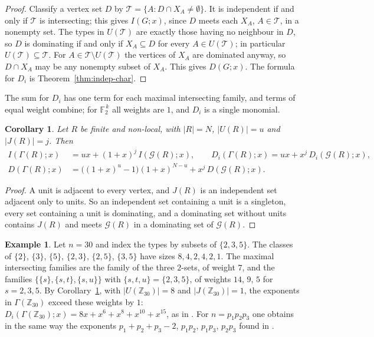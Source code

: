 \documentclass[11pt]{amsart}
\newtheorem{corollary}[theorem]{Corollary}
\theoremstyle{definition}
\newtheorem{example}[theorem]{Example}
\theoremstyle{remark}
\newcommand{\Jac}{J}
\newcommand{\G}{\mathcal{G}}
\newcommand{\Z}{\mathbb{Z}}
\newcommand{\FF}{\mathbb{F}}
\newcommand{\Bool}[1]{\FF_2^{\,#1}}
\begin{document}
\begin{proof}
Classify a vertex set $D$ by $\mathcal T=\{A:D\cap X_A\ne\emptyset\}$. It is independent if and only
if $\mathcal T$ is intersecting; this gives $I(G;x)$, since $D$ meets each $X_A$, $A\in\mathcal T$,
in a nonempty set. The types in $U(\mathcal T)$ are exactly those having no neighbour in $D$, so $D$
is dominating if and only if $X_A\subseteq D$ for every $A\in U(\mathcal T)$; in particular
$U(\mathcal T)\subseteq\mathcal T$. For $A\in\mathcal T\setminus U(\mathcal T)$ the vertices of
$X_A$ are dominated anyway, so $D\cap X_A$ may be any nonempty subset of $X_A$. This gives
$D(G;x)$. The formula for $D_i$ is Theorem~\ref{thm:indep-char}.
\end{proof}

The sum for $D_i$ has one term for each maximal intersecting family, and terms of equal weight
combine; for $\Bool k$ all weights are $1$, and $D_i$ is a single monomial.

\begin{corollary}\label{cor:full-graph-polys}
Let $R$ be finite and non-local, with $|R|=N$, $|U(R)|=u$ and $|\Jac(R)|=j$. Then
\begin{align*}
I(\Gamma(R);x)   &= ux + (1+x)^{j}\,I(\G(R);x),\qquad
D_i(\Gamma(R);x) = ux + x^{j}\,D_i(\G(R);x),\\
D(\Gamma(R);x)   &= \bigl((1+x)^{u}-1\bigr)(1+x)^{N-u} + x^{j}\,D(\G(R);x).
\end{align*}
\end{corollary}

\begin{proof}
A unit is adjacent to every vertex, and $\Jac(R)$ is an independent set adjacent only to units. So
an independent set containing a unit is a singleton, every set containing a unit is dominating, and
a dominating set without units contains $\Jac(R)$ and meets $\G(R)$ in a dominating set of $\G(R)$.
\end{proof}

\begin{example}
Let $n=30$ and index the types by subsets of $\{2,3,5\}$. The classes of
$\{2\}$, $\{3\}$, $\{5\}$, $\{2,3\}$, $\{2,5\}$, $\{3,5\}$ have sizes $8,4,2,4,2,1$. The maximal intersecting
families are the family of the three $2$-sets, of weight $7$, and the families
$\{\{s\},\{s,t\},\{s,u\}\}$ with $\{s,t,u\}=\{2,3,5\}$, of weights $14$, $9$, $5$ for $s=2,3,5$.
By Corollary~\ref{cor:full-graph-polys}, with $|U(\Z_{30})|=8$ and $|\Jac(\Z_{30})|=1$, the
exponents in $\Gamma(\Z_{30})$ exceed these weights by $1$:
$D_i(\Gamma(\Z_{30});x)=8x+x^6+x^8+x^{10}+x^{15}$, as in \cite{Ra26a}. For $n=p_1p_2p_3$ one obtains
in the same way the exponents $p_1+p_2+p_3-2$, $p_1p_2$, $p_1p_3$, $p_2p_3$ found in \cite{Ra26a}.
\end{example}
\end{document}
